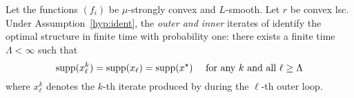 


\begin{theorem}[Identification]\label{th:ident}
Let the functions $(f_i)$ be $\mu$-strongly convex and $L$-smooth. Let $r$ be convex lsc. Under Assumption~\ref{hyp:ident}, the \emph{outer and inner} iterates of \recoalgo %
identify the optimal structure in finite time with probability one: there exists a finite time $\Lambda<\infty$ such that
$$ 
\mathrm{supp}(x^k_\ell) = \mathrm{supp}(x_\ell)  = \mathrm{supp}(x^\star) ~~~ \text{ for any } k \text{ and all }  \ell \geq \Lambda
$$
where $x^k_\ell$ denotes the $k$-th iterate produced by \salgo during the $\ell$-th outer loop.
\end{theorem}

